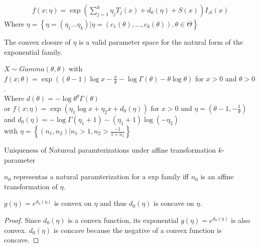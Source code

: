 \documentclass[answers,12pt,addpoints]{exam}
\begin{document}
\begin{remark}
    \begin{align*}
        f(x: \eta) = \exp\left( 
        \sum_{j=1}^k \eta_j T_j(x) + d_0(\eta) + S(x)
    \right) I_{\mathcal{A}}(x)
    \end{align*}
    Where $\eta = \left\{\eta = (\eta_1 ... \eta_k) | \eta = (c_1(\theta), ..., c_k(\theta)) , \theta \in \Theta \right\}$
\end{remark}
\begin{lemma}
    The convex closure of $\eta$ is a valid parameter space for the natural form of the exponential family.
\end{lemma}
\begin{example}
    $X \sim Gamma(\theta, \theta)$ with $f(x;\theta) = \exp\left( (\theta-1)\log x - \frac{x}{\theta} - \log \Gamma(\theta) - \theta \log \theta \right)$ for $x > 0$ and $\theta > 0$.\\
    Where $d(\theta) = -\log \theta^\theta \Gamma(\theta)$ \\
    or $f(x; \eta) = \exp\left( \eta_1 \log x + \eta_2 x + d_0(\eta) \right)$ for $x > 0$ and $\eta = (\theta-1, -\frac{1}{\theta})$ and $d_0(\eta) = -\log \Gamma(\eta_1+1) - (\eta_1+1)\log(-\eta_2)$\\
    with $ \eta = \left\{(n_1, n_2)| n_1 > 1, n_2 > \frac{-1}{1+n_1}\right\}$
\end{example}
\begin{lemma}
    Uniqueness of Natureal paramterizations under affine transformation $k$- parameter

    $n_0$ representas a natural paramterization for a exp family iff $n_0$ is an affine transformation of $\eta$.
\end{lemma}

\begin{corollary}
    $g(\eta) = e^{d_0(\eta)}$ is convex on $\eta$ and thus $d_0(\eta)$ is concave on $\eta$.
    \begin{proof}
        Since $d_0(\eta)$ is a convex function, its exponential $g(\eta) = e^{d_0(\eta)}$ is also convex.
        $d_0(\eta)$ is concave because the negative of a convex function is concave.


    \end{proof}

\end{corollary}
\end{document}
